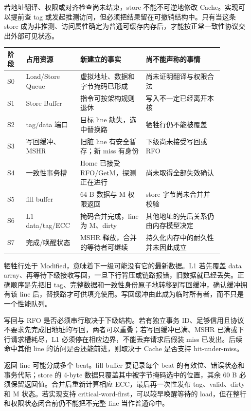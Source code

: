 若地址翻译、权限或对齐检查尚未结束，store 不能不可逆地修改 Cache。实现可以提前查 tag 或发起推测访问，但必须把结果留在可撤销结构中。只有当这条 store 成为非推测、访问属性确定为普通可缓存内存后，才能按正常一致性协议交出外部可见状态。

\begin{longtable}{L{0.08\linewidth}L{0.19\linewidth}L{0.28\linewidth}L{0.33\linewidth}}
\toprule
阶段 & 占用资源 & 新建立的事实 & 尚不能声称的事情 \\
\midrule
S0 & Load/Store Queue & 虚拟地址、数据和字节掩码已形成 & 尚未证明翻译与权限合法 \\\tablerowrule
S1 & Store Buffer & 指令可按架构规则退休 & 写入不一定已经离开本核 \\\tablerowrule
S2 & tag/data 端口 & 目标 line 缺失，选中替换路 & 牺牲行仍不能被覆盖 \\\tablerowrule
S3 & 写回缓冲、MSHR & 旧脏 line 有安全暂存；新 miss 有身份 & 下级尚未接受写回或 RFO \\\tablerowrule
S4 & 一致性事务槽 & Home 已接受 RFO/GetM，探测正在进行 & 尚未取得全部失效确认 \\\tablerowrule
S5 & fill buffer & 64 B 数据与 M 权限返回 & store 字节尚未合并并校验 \\\tablerowrule
S6 & L1 data/tag/ECC & 掩码合并完成，line 为 M、dirty & 其他地址的先后关系仍由内存模型决定 \\\tablerowrule
S7 & 完成/唤醒状态 & MSHR 释放，合并的等待者可继续 & 持久化内存中的耐久性并未因此成立 \\
\bottomrule
\end{longtable}


牺牲行处于 Modified，意味着下一级可能没有它的最新数据。L1 若先覆盖 data array、再等待下级接收写回，一旦下行背压或链路报错，旧数据就已经丢失。正确顺序是先把旧 tag、完整数据和一致性身份原子地转移到写回缓冲，确认缓冲拥有该 line 后，替换路才可供填充使用。写回缓冲由此成为临时所有者，而不只是一个性能队列。

写回与 RFO 是否必须串行取决于下级结构。若有独立事务 ID、足够信用且协议不要求先完成旧地址的写回，两者可以重叠；若写回缓冲已满、MSHR 已满或下行请求槽耗尽，L1 必须停在相应边界，不能丢弃请求后假装 miss 已发出。后续命中其他 line 的访问是否还能前进，则取决于 Cache 是否支持 hit-under-miss。


返回 line 可能分成多个 beat。fill buffer 要记录每个 beat 的有效位、错误状态和事务代际；store 的 4-byte 数据只覆盖其中被字节掩码选中的位置，其余 60 B 必须保留返回值。合并后重新计算相应 ECC，最后再一次性发布 tag、valid、dirty 和 M 状态。若实现支持 critical-word-first，可以较早唤醒等待的 load，但在整行和权限状态闭合前仍不能把不完整 line 当作普通命中。

